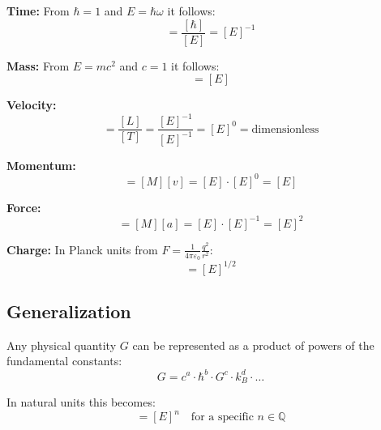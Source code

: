 	\textbf{Time:} From $\hbar = 1$ and $E = \hbar \omega$ it follows:
	\begin{equation}
		[T] = \frac{[\hbar]}{[E]} = [E]^{-1}
	\end{equation}
	
	\textbf{Mass:} From $E = mc^2$ and $c = 1$ it follows:
	\begin{equation}
		[M] = [E]
	\end{equation}
	
	\textbf{Velocity:} 
	\begin{equation}
		[v] = \frac{[L]}{[T]} = \frac{[E]^{-1}}{[E]^{-1}} = [E]^0 = \text{dimensionless}
	\end{equation}
	
	\textbf{Momentum:}
	\begin{equation}
		[p] = [M][v] = [E] \cdot [E]^0 = [E]
	\end{equation}
	
	\textbf{Force:}
	\begin{equation}
		[F] = [M][a] = [E] \cdot [E]^{-1} = [E]^2
	\end{equation}
	
	\textbf{Charge:} In Planck units from $F = \frac{1}{4\pi\varepsilon_0} \frac{q^2}{r^2}$:
	\begin{equation}
		[q] = [E]^{1/2}
	\end{equation}
	
	\subsection{Generalization}
	
	Any physical quantity $G$ can be represented as a product of powers of the fundamental constants:
	\begin{equation}
		G = c^a \cdot \hbar^b \cdot G^c \cdot k_B^d \cdot \ldots
	\end{equation}
	
	In natural units this becomes:
	\begin{equation}
		[G] = [E]^n \quad \text{for a specific } n \in \mathbb{Q}
	\end{equation}
	
